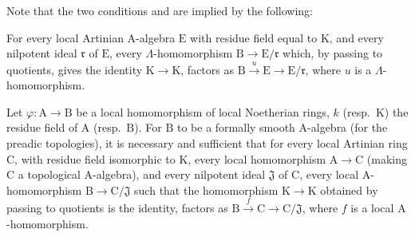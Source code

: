 \begin{remark}[22.1.3]
Note that the two conditions  and  are implied by the following:

\begin{env}[22.1.3.3]
\label{0.22.1.3.3}
For every local Artinian $\mathrm{A}$-algebra $\mathrm{E}$ with residue field equal to $\mathrm{K}$, and every nilpotent ideal $\mathfrak{r}$ of $\mathrm{E}$, every $\Lambda$-homomorphism $\mathrm{B}\to\mathrm{E}/\mathfrak{r}$ which, by passing to quotients, gives the identity $\mathrm{K}\to\mathrm{K}$, factors as $\mathrm{B}\xrightarrow{u}\mathrm{E}\to\mathrm{E}/\mathfrak{r}$, where $u$ is a $\Lambda$-homomorphism.
\end{env}
\end{remark}

\begin{proposition}[22.1.4]
\label{0.22.1.4}
Let $\varphi:\mathrm{A}\to\mathrm{B}$ be a local homomorphism of local Noetherian rings, $k$ (resp.~$\mathrm{K}$) the residue field of $\mathrm{A}$ (resp.~$\mathrm{B}$).
For $\mathrm{B}$ to be a formally smooth $\mathrm{A}$-algebra (for the preadic topologies), it is necessary and sufficient that for every local Artinian ring $\mathrm{C}$, with residue field isomorphic to $\mathrm{K}$, every local homomorphism $\mathrm{A}\to\mathrm{C}$ (making $\mathrm{C}$ a topological $\mathrm{A}$-algebra), and every nilpotent ideal $\mathfrak{J}$ of $\mathrm{C}$, every local $\mathrm{A}$-homomorphism $\mathrm{B}\to\mathrm{C}/\mathfrak{J}$ such that the homomorphism $\mathrm{K}\to\mathrm{K}$ obtained by passing to quotients is the identity, factors as $\mathrm{B}\xrightarrow{f}\mathrm{C}\to\mathrm{C}/\mathfrak{J}$, where $f$ is a local $\mathrm{A}$-homomorphism.
\end{proposition}

